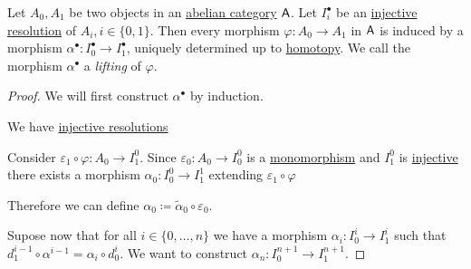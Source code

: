 \documentclass[../../../main]{subfiles}
\begin{document}
\begin{theorem}\label{thm:existence-of-lifting}
  Let \(A_{0}, A_{1}\) be two objects in an \hyperref[def:abelian-category]{abelian category} \(\mathsf{A}\).
  Let \(I_{i}^{\bullet}\) be an \hyperref[def:injective-projective-resolution]{injective resolution} of \(A_{i}, i \in \{0, 1\}\).
  Then every morphism \(\varphi: A_{0} \to A_{1}\) in \(\mathsf{A}\) is induced by a morphism \(\alpha^{\bullet}: I_{0}^{\bullet} \to I_{1}^{\bullet}\), uniquely determined up to \hyperref[def:homotopy]{homotopy}.
  We call the morphism \(\alpha^{\bullet}\) a \textit{lifting} of \(\varphi\).
\end{theorem}
\begin{proof}
  We will first construct \(\alpha^{\bullet}\) by induction.
  
  We have \hyperref[def:injective-projective-resolution]{injective resolutions}
  \begin{center}
  \end{center}
  Consider \(\varepsilon_{1} \circ \varphi: A_{0} \to I_{1}^{0}\).
  Since \(\varepsilon_{0}: A_{0} \to I_{0}^{0}\) is a \hyperref[def:mono-epi-morphism]{monomorphism} and \(I_{1}^{0}\) is \hyperref[def:injective-projective-object]{injective} there exists a morphism \(\alpha_{0}: I_{0}^{0} \to I_{1}^{1}\) extending \(\varepsilon_{1} \circ \varphi\)
  \begin{center}
  \end{center}
  Therefore we can define \(\alpha_{0} \coloneq \widetilde{\alpha}_{0} \circ \varepsilon_{0}\).
  
  Supose now that for all \(i \in \{0, \ldots, n\}\) we have a morphism \(\alpha_{i}: I_{0}^{i} \to I_{1}^{i}\) such that \(d_{1}^{i-1} \circ \alpha^{i-1} = \alpha_{i} \circ d_{0}^{i}\). We want to construct \(\alpha_{n}: I_{0}^{n+1} \to I_{1}^{n+1}\).


\end{proof}
\end{document}
